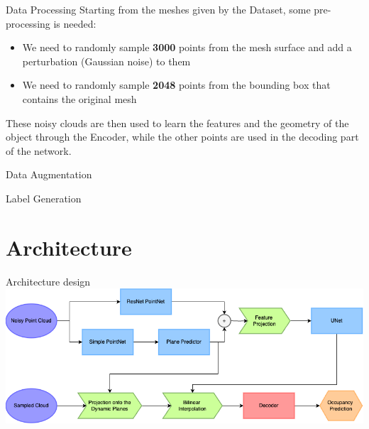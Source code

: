 \documentclass{beamer}
\begin{document}
\begin{frame}{Data Processing}
    Starting from the meshes given by the Dataset, some pre-processing is needed:
    \begin{itemize}
        \item We need to randomly sample \textbf{3000} points from the mesh surface and add a perturbation (Gaussian noise) to them 
        \item We need to randomly sample \textbf{2048} points from the bounding box that contains the original mesh
    \end{itemize}
    These noisy clouds are then used to learn the features and the geometry of the object through the Encoder, while the other points are used in the decoding part of the network.
\end{frame}

\begin{frame}{Data Augmentation}

\end{frame}
\begin{frame}{Label Generation}

\end{frame}

\section{Architecture}

\begin{frame}{Architecture design}
\includegraphics[width=\textwidth]{../media/pipeline_chiaro.png}
\end{frame}
\end{document}
